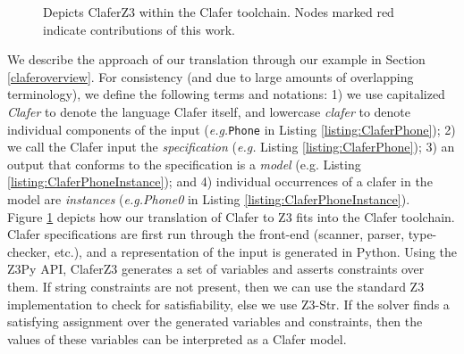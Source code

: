 \documentclass{easychair}
\newcommand{\eg}{\emph{e.g.}\xspace}
\begin{document}
\begin{figure}
\centering
\label{claferZ3toolchain}
\caption{Depicts ClaferZ3 within the Clafer toolchain. Nodes marked red indicate contributions of this work.}
\end{figure}
We describe the approach of our translation through our example in Section \ref{claferoverview}. For consistency (and due to large amounts of overlapping terminology), we define the following terms and notations: 1) we use capitalized \textit{Clafer} to denote the language Clafer itself, and lowercase \textit{clafer} to denote individual components of the input (\eg \texttt{Phone} in Listing \ref{listing:ClaferPhone}); 2) we call the Clafer input the \textit{specification} (\eg Listing \ref{listing:ClaferPhone}); 3) an output that conforms to the specification is a \textit{model} (e.g. Listing \ref{listing:ClaferPhoneInstance}); and 4) individual occurrences of a clafer in the model are \textit{instances} (\eg \textit{Phone0} in Listing \ref{listing:ClaferPhoneInstance}). \\
\indent Figure \ref{claferZ3toolchain} depicts how our translation of Clafer to Z3 fits into the Clafer toolchain. Clafer specifications are first run through the front-end (scanner, parser, type-checker, etc.), and a representation of the input is generated in Python. Using the Z3Py API, ClaferZ3 generates a set of variables and asserts constraints over them. If string constraints are not present, then we can use the standard Z3 implementation to check for satisfiability, else we use Z3-Str.  If the solver finds a satisfying assignment over the generated variables and constraints, then the values of these variables can be interpreted as a Clafer model. \\
\end{document}
